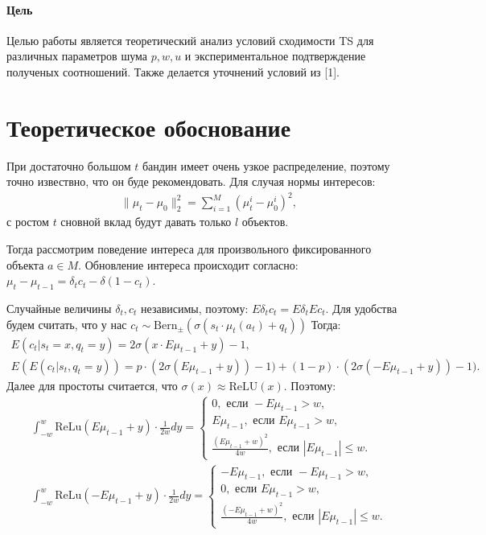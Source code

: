 \documentclass[12pt, twoside]{article}
\begin{document}
\paragraph{Цель}
Целью работы является теоретический анализ условий сходимости TS для различных параметров шума $p, w, u$ и экспериментальное подтверждение полученых соотношений. 
Также делается уточнений условий из [1]. 

\section{Теоретическое обоснование}
При достаточно большом $t$ бандин имеет очень узкое распределение, поэтому точно извествно, что он буде рекомендовать.
Для случая нормы интересов: 
\begin{gather*}
  \|\mu_t - \mu_0 \|^2_2 = \sum_{i=1}^M (\mu_t^i - \mu_0^i)^2,
\end{gather*}
с ростом $t$ сновной вклад будут давать только $l$ объектов.

Тогда рассмотрим поведение интереса для произвольного фиксированного объекта $a \in M$. 
Обновление интереса происходит согласно: $\mu_t - \mu_{t-1} = \delta_t c_t - \delta (1 - c_t)$.

Случайные величины $\delta_t, c_t$ независимы, поэтому: $E \delta_t c_t = E \delta_t E c_t$. 
Для удобства будем считать, что у нас $c_t \sim \text{Bern}_{\pm}(\sigma(s_t \cdot \mu_t(a_t) + q_t))$
Тогда: 
\begin{gather*}
  E (c_t | s_t = x, q_t = y) = 2 \sigma(x \cdot E \mu_{t-1} + y) - 1, \\
  E (E (c_t | s_t, q_t = y)) = p \cdot (2 \sigma(E \mu_{t-1} + y)) - 1) +  (1-p) \cdot (2 \sigma(- E\mu_{t-1} + y)) - 1).  
\end{gather*}
Далее для простоты считается, что $\sigma(x) \approx \text{ReLU}(x)$.
Поэтому: 
\begin{gather*}
  \int_{-w}^w \text{ReLu}(E\mu_{t-1} + y) \cdot \frac{1}{2 w} dy =  
    \begin{cases} 
      0, \text{ если } -E\mu_{t-1} > w, \\
      E\mu_{t-1}, \text{ если } E\mu_{t-1} > w, \\
      \frac{(E\mu_{t-1} + w)^2}{4 w}, \text{ если } |E\mu_{t-1}| \leq w.
    \end{cases} \\ 
  \int_{-w}^w \text{ReLu}(-E\mu_{t-1} + y) \cdot \frac{1}{2 w} dy =  
    \begin{cases} 
      -E\mu_{t-1}, \text{ если } -E\mu_{t-1} > w, \\
      0, \text{ если } E\mu_{t-1} > w, \\
      \frac{(-E\mu_{t-1} + w)^2}{4 w}, \text{ если } |E\mu_{t-1}| \leq w.
    \end{cases} 
\end{gather*}
\end{document}

